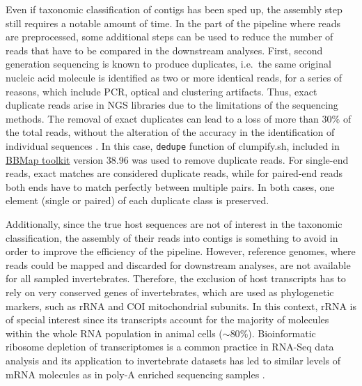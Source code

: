 \documentclass[
  openany]{book}
\begin{document}
Even if taxonomic classification of contigs has been sped up, the assembly step still requires a notable amount of time. In the part of the pipeline where reads are preprocessed, some additional steps can be used to reduce the number of reads that have to be compared in the downstream analyses. First, second generation sequencing is known to produce duplicates, i.e.~the same original nucleic acid molecule is identified as two or more identical reads, for a series of reasons, which include PCR, optical and clustering artifacts. Thus, exact duplicate reads arise in NGS libraries due to the limitations of the sequencing methods. The removal of exact duplicates can lead to a loss of more than \(30\%\) of the total reads, without the alteration of the accuracy in the identification of individual sequences \autocite{Ebbert2016}. In this case, \texttt{dedupe} function of clumpify.sh, included in \href{https://sourceforge.net/projects/bbmap/}{BBMap toolkit} \autocite{Bushnell2014} version 38.96 was used to remove duplicate reads. For single-end reads, exact matches are considered duplicate reads, while for paired-end reads both ends have to match perfectly between multiple pairs. In both cases, one element (single or paired) of each duplicate class is preserved.

Additionally, since the true host sequences are not of interest in the taxonomic classification, the assembly of their reads into contigs is something to avoid in order to improve the efficiency of the pipeline. However, reference genomes, where reads could be mapped and discarded for downstream analyses, are not available for all sampled invertebrates. Therefore, the exclusion of host transcripts has to rely on very conserved genes of invertebrates, which are used as phylogenetic markers, such as rRNA and COI mitochondrial subunits. In this context, rRNA is of special interest since its transcripts account for the majority of molecules within the whole RNA population in animal cells (\(\sim80\%\)). Bioinformatic ribosome depletion of transcriptomes is a common practice in RNA-Seq data analysis and its application to invertebrate datasets has led to similar levels of mRNA molecules as in poly-A enriched sequencing samples \autocite{Kim2019}.
\end{document}
